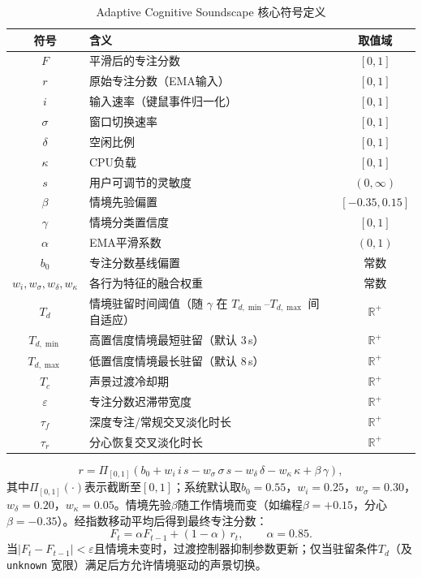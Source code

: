 \documentclass[12pt, fontset=windows]{ctexart}
\begin{document}
\begin{table}[H]
\centering
\caption{Adaptive Cognitive Soundscape 核心符号定义}
\label{tab:acs-vars}
\begin{tabular}{@{}clc@{}}
\toprule
\textbf{符号} & \textbf{含义} & \textbf{取值域} \\
\midrule
$F$ & 平滑后的专注分数 & $[0,1]$ \\
$r$ & 原始专注分数（EMA输入） & $[0,1]$ \\
$i$ & 输入速率（键鼠事件归一化） & $[0,1]$ \\
$\sigma$ & 窗口切换速率 & $[0,1]$ \\
$\delta$ & 空闲比例 & $[0,1]$ \\
$\kappa$ & CPU负载 & $[0,1]$ \\
$s$ & 用户可调节的灵敏度 & $(0,\infty)$ \\
$\beta$ & 情境先验偏置 & $[-0.35,0.15]$ \\
$\gamma$ & 情境分类置信度 & $[0,1]$ \\
$\alpha$ & EMA平滑系数 & $(0,1)$ \\
$b_0$ & 专注分数基线偏置 & 常数 \\
$w_i,w_\sigma,w_\delta,w_\kappa$ & 各行为特征的融合权重 & 常数 \\
$T_d$ & 情境驻留时间阈值（随 $\gamma$ 在 $T_{d,\min}$--$T_{d,\max}$ 间自适应） & $\mathbb{R}^+$ \\
$T_{d,\min}$ & 高置信度情境最短驻留（默认 3\,s） & $\mathbb{R}^+$ \\
$T_{d,\max}$ & 低置信度情境最长驻留（默认 8\,s） & $\mathbb{R}^+$ \\
$T_c$ & 声景过渡冷却期 & $\mathbb{R}^+$ \\
$\varepsilon$ & 专注分数迟滞带宽度 & $\mathbb{R}^+$ \\
$\tau_f$ & 深度专注/常规交叉淡化时长 & $\mathbb{R}^+$ \\
$\tau_r$ & 分心恢复交叉淡化时长 & $\mathbb{R}^+$ \\
\bottomrule
\end{tabular}
\end{table}

\begin{equation}
\label{eq:focus-raw}
r = \Pi_{[0,1]}\!\left(
b_0 + w_i\, i\, s - w_\sigma\, \sigma\, s - w_\delta\, \delta - w_\kappa\, \kappa + \beta\, \gamma
\right),
\end{equation}
其中$\Pi_{[0,1]}(\cdot)$表示截断至$[0,1]$；系统默认取$b_0=0.55$，$w_i=0.25$，$w_\sigma=0.30$，$w_\delta=0.20$，$w_\kappa=0.05$。情境先验$\beta$随工作情境而变（如编程$\beta=+0.15$，分心$\beta=-0.35$）。经指数移动平均后得到最终专注分数：
\begin{equation}
\label{eq:focus-ema}
F_t = \alpha F_{t-1} + (1-\alpha)\, r_t, \qquad \alpha = 0.85.
\end{equation}
当$|F_t - F_{t-1}| < \varepsilon$且情境未变时，过渡控制器抑制参数更新；仅当驻留条件$T_d$（及 \texttt{unknown} 宽限）满足后方允许情境驱动的声景切换。
\end{document}

